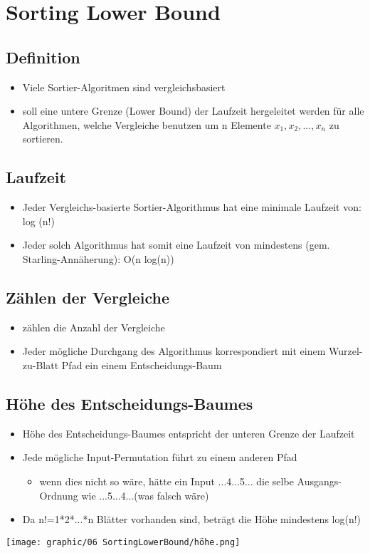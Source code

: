\section{Sorting Lower Bound}

\subsection{Definition}
\begin{itemize}
    \item Viele Sortier-Algoritmen sind vergleichsbasiert
    \item soll eine untere Grenze (Lower Bound) der Laufzeit hergeleitet werden für alle Algorithmen, welche Vergleiche benutzen um n Elemente $x_1, x_2, ..., x_n$ zu sortieren.
\end{itemize}

\subsection{Laufzeit}
\begin{itemize}
    \item Jeder Vergleichs-basierte Sortier-Algorithmus hat eine minimale Laufzeit von: log (n!)
    \item Jeder solch Algorithmus hat somit eine Laufzeit von
    mindestens (gem. Starling-Annäherung): O(n log(n))
\end{itemize}

\subsection{Zählen der Vergleiche}
\begin{itemize}
    \item zählen die Anzahl der Vergleiche
    \item Jeder mögliche Durchgang des Algorithmus korrespondiert mit einem Wurzel-zu-Blatt Pfad ein einem Entscheidungs-Baum
\end{itemize}


\subsection{Höhe des Entscheidungs-Baumes}
\begin{itemize}
    \item Höhe des Entscheidungs-Baumes entspricht der unteren Grenze der Laufzeit
    \item Jede mögliche Input-Permutation führt zu einem anderen Pfad
    \begin{itemize}
        \item wenn dies nicht so wäre, hätte ein Input ...4...5... die selbe Ausgangs-Ordnung wie ...5...4...(was falsch wäre)
    \end{itemize}
    \item Da n!=1*2*...*n Blätter vorhanden sind, beträgt die Höhe mindestens log(n!)
\end{itemize}
\vspace{-8pt}
\begin{center}
    \texttt{[image: graphic/06 SortingLowerBound/höhe.png]}
\end{center}
\vspace{-8pt}

\vfill
$ $
\columnbreak

